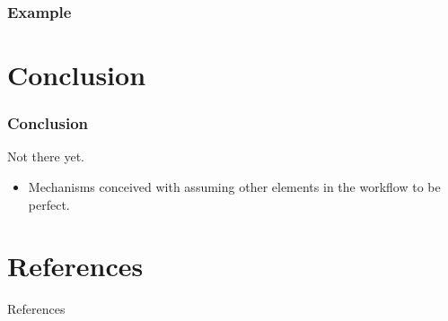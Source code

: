 \documentclass{beamer}
\begin{document}
\begin{frame}
  \frametitle{Example~\cite{sharma2011cost}}
\end{frame}


\section*{Conclusion}
\begin{frame}
  \frametitle{Conclusion}
  Not there yet.
  \begin{itemize}
    \item Mechanisms conceived with assuming other elements in the workflow to be perfect.
  \end{itemize}
\end{frame}


\appendix
\section*{References}
\begin{frame}[allowframebreaks]{References}
  
  
\end{frame}
\end{document}
